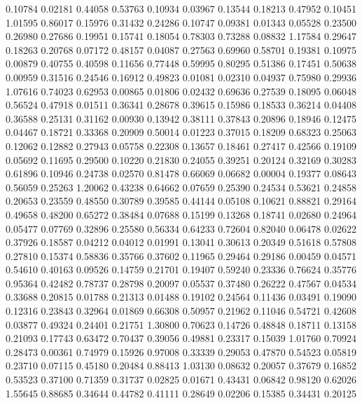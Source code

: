   0.10784 0.02181
  0.44058 0.53763
  0.10934 0.03967
  0.13544 0.18213
  0.47952 0.10451
  1.01595 0.86017
  0.15976 0.31432
  0.24286 0.10747
  0.09381 0.01343
  0.05528 0.23500
  0.26980 0.27686
  0.19951 0.15741
  0.18054 0.78303
  0.73288 0.08832
  1.17584 0.29647
  0.18263 0.20768
  0.07172 0.48157
  0.04087 0.27563
  0.69960 0.58701
  0.19381 0.10975
  0.00879 0.40755
  0.40598 0.11656
  0.77448 0.59995
  0.80295 0.51386
  0.17451 0.50638
  0.00959 0.31516
  0.24546 0.16912
  0.49823 0.01081
  0.02310 0.04937
  0.75980 0.29936
  1.07616 0.74023
  0.62953 0.00865
  0.01806 0.02432
  0.69636 0.27539
  0.18095 0.06048
  0.56524 0.47918
  0.01511 0.36341
  0.28678 0.39615
  0.15986 0.18533
  0.36214 0.04408
  0.36588 0.25131
  0.31162 0.00930
  0.13942 0.38111
  0.37843 0.20896
  0.18946 0.12475
  0.04467 0.18721
  0.33368 0.20909
  0.50014 0.01223
  0.37015 0.18209
  0.68323 0.25063
  0.12062 0.12882
  0.27943 0.05758
  0.22308 0.13657
  0.18461 0.27417
  0.42566 0.19109
  0.05692 0.11695
  0.29500 0.10220
  0.21830 0.24055
  0.39251 0.20124
  0.32169 0.30283
  0.61896 0.10946
  0.24738 0.02570
  0.81478 0.66069
  0.06682 0.00004
  0.19377 0.08643
  0.56059 0.25263
  1.20062 0.43238
  0.64662 0.07659
  0.25390 0.24534
  0.53621 0.24858
  0.20653 0.23559
  0.48550 0.30789
  0.39585 0.44144
  0.05108 0.10621
  0.88821 0.29164
  0.49658 0.48200
  0.65272 0.38484
  0.07688 0.15199
  0.13268 0.18741
  0.02680 0.24964
  0.05477 0.07769
  0.32896 0.25580
  0.56334 0.64233
  0.72604 0.82040
  0.06478 0.02622
  0.37926 0.18587
  0.04212 0.04012
  0.01991 0.13041
  0.30613 0.20349
  0.51618 0.57808
  0.27810 0.15374
  0.58836 0.35766
  0.37602 0.11965
  0.29464 0.29186
  0.00459 0.04571
  0.54610 0.40163
  0.09526 0.14759
  0.21701 0.19407
  0.59240 0.23336
  0.76624 0.35776
  0.95364 0.42482
  0.78737 0.28798
  0.20097 0.05537
  0.37480 0.26222
  0.47567 0.04534
  0.33688 0.20815
  0.01788 0.21313
  0.01488 0.19102
  0.24564 0.11436
  0.03491 0.19090
  0.12316 0.23843
  0.32964 0.01869
  0.66308 0.50957
  0.21962 0.11046
  0.54721 0.42608
  0.03877 0.49324
  0.24401 0.21751
  1.30800 0.70623
  0.14726 0.48848
  0.18711 0.13158
  0.21093 0.17743
  0.63472 0.70437
  0.39056 0.49881
  0.23317 0.15039
  1.01760 0.70924
  0.28473 0.00361
  0.74979 0.15926
  0.97008 0.33339
  0.29053 0.47870
  0.54523 0.05819
  0.23710 0.07115
  0.45180 0.20484
  0.88413 1.03130
  0.08632 0.20057
  0.37679 0.16852
  0.53523 0.37100
  0.71359 0.31737
  0.02825 0.01671
  0.43431 0.06842
  0.98120 0.62026
  1.55645 0.88685
  0.34644 0.44782
  0.41111 0.28649
  0.02206 0.15385
  0.34431 0.20125
